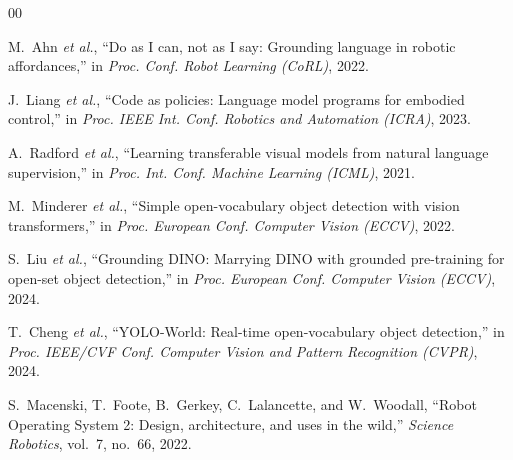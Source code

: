 \documentclass[conference]{IEEEtran}
\begin{document}
\begin{thebibliography}{00}

 M.~Ahn \emph{et al.}, ``Do as I can, not as I say: Grounding
language in robotic affordances,'' in \emph{Proc. Conf. Robot Learning (CoRL)},
2022.

 J.~Liang \emph{et al.}, ``Code as policies: Language
model programs for embodied control,'' in \emph{Proc. IEEE Int. Conf. Robotics
and Automation (ICRA)}, 2023.

 A.~Radford \emph{et al.}, ``Learning transferable visual models
from natural language supervision,'' in \emph{Proc. Int. Conf. Machine Learning
(ICML)}, 2021.

 M.~Minderer \emph{et al.}, ``Simple open-vocabulary object
detection with vision transformers,'' in \emph{Proc. European Conf. Computer
Vision (ECCV)}, 2022.

 S.~Liu \emph{et al.}, ``Grounding DINO: Marrying DINO
with grounded pre-training for open-set object detection,'' in \emph{Proc.
European Conf. Computer Vision (ECCV)}, 2024.

 T.~Cheng \emph{et al.}, ``YOLO-World: Real-time
open-vocabulary object detection,'' in \emph{Proc. IEEE/CVF Conf. Computer
Vision and Pattern Recognition (CVPR)}, 2024.

 S.~Macenski, T.~Foote, B.~Gerkey, C.~Lalancette, and W.~Woodall,
``Robot Operating System 2: Design, architecture, and uses in the wild,''
\emph{Science Robotics}, vol.~7, no.~66, 2022.

\end{thebibliography}
\end{document}
